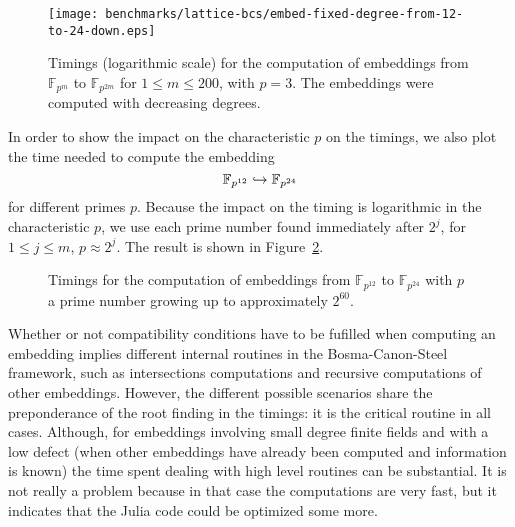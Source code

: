 \begin{figure}
  \centering
  \texttt{[image: benchmarks/lattice-bcs/embed-fixed-degree-from-12-to-24-down.eps]}
  \caption{Timings (logarithmic scale) for the computation of embeddings from $\mathbb{F}_{p^{m}}$
  to $\mathbb{F}_{p^{2m}}$ for $1\leq m\leq 200$, with $p=3$. The
  embeddings were computed with decreasing degrees.}
  \label{fig:bcs-embed-fixed-degree-down}
\end{figure}
In order to show the impact on the characteristic $p$ on the timings, we also
plot the time needed to compute the embedding
\[
  \mathbb{F}_{p^{12}}\hookrightarrow\mathbb{F}_{p^{24}}
\]
for different primes $p$. Because the impact on the timing is logarithmic in the
characteristic $p$, we use each prime number found immediately after $2^j$,
for $1\leq j\leq m$, \ie $p\approx 2^j$. The result is shown in
Figure~\ref{fig:bcs-embed-primes}.
\begin{figure}
  \centering
  
  \caption{Timings for the computation of embeddings from $\mathbb{F}_{p^{12}}$
  to $\mathbb{F}_{p^{24}}$ with $p$ a prime number growing up to approximately
  $2^{60}$.}
  \label{fig:bcs-embed-primes}
\end{figure}
Whether or not compatibility conditions have to be fufilled when computing an
embedding implies different internal routines in the Bosma-Canon-Steel
framework, such as intersections computations and recursive computations of
other embeddings. However, the different possible scenarios share the
preponderance of the root finding in the timings: it is the critical routine in
all cases. Although, for embeddings involving small degree finite fields and
with a low defect (\ie when other embeddings have already been computed and
information is known) the time spent dealing with high level routines can be
substantial. It is not really a problem because in that case the computations
are very fast, but it indicates that the Julia code could be optimized some
more.

%
